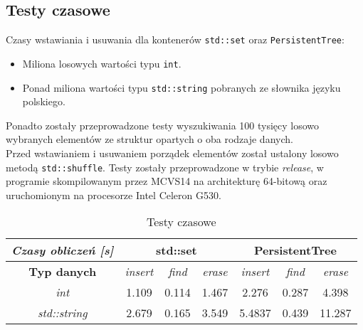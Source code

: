 \documentclass[a4paper,twoside]{article}
\begin{document}
	\subsection{Testy czasowe}
	Czasy wstawiania i usuwania dla kontenerów \lstinline|std::set| oraz \lstinline|PersistentTree|:
	\begin{itemize}
		\item Miliona losowych wartości typu \lstinline|int|.
		\item Ponad miliona wartości typu \lstinline|std::string| pobranych ze słownika języku polskiego.
	\end{itemize}
	Ponadto zostały przeprowadzone testy wyszukiwania 100 tysięcy losowo wybranych elementów ze struktur opartych o oba rodzaje danych.\\
	Przed wstawianiem i usuwaniem porządek elementów został ustalony losowo metodą \lstinline|std::shuffle|. Testy zostały przeprowadzone w trybie \textit{release}, w programie skompilowanym przez MCVS14 na architekturę 64-bitową oraz uruchomionym na procesorze Intel Celeron G530.
	\begin{table}[h]
		\centering
		\caption{Testy czasowe}
		\begin{tabular}{c|c|c|c|c|c|c|}
			\cline{2-7}
			\textit{\textbf{Czasy obliczeń {[}s{]}}}   & \multicolumn{3}{c|}{\textbf{std::set}}           & \multicolumn{3}{c|}{\textbf{PersistentTree}}     \\ \hline
			\multicolumn{1}{|c|}{\textbf{Typ danych}}  & \textit{insert} & \textit{find} & \textit{erase} & \textit{insert} & \textit{find} & \textit{erase} \\ \hline
			\multicolumn{1}{|c|}{\textit{int}}         & 1.109           & 0.114         & 1.467          & 2.276           & 0.287         & 4.398          \\ \hline
			\multicolumn{1}{|c|}{\textit{std::string}} & 2.679           & 0.165         & 3.549          & 5.4837          & 0.439         & 11.287         \\ \hline
		\end{tabular}
	\end{table}
	
\end{document}
